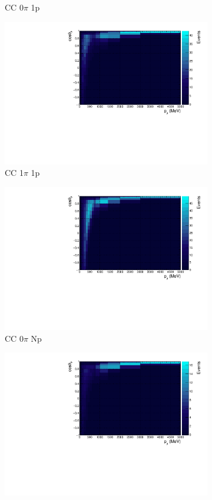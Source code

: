 \begin{figure}
\begin{subfigure}{.49\textwidth}
  \caption{CC 0$\pi$ 1p}
\end{subfigure}
\begin{subfigure}{.49\textwidth}
  \centering
  \includegraphics[width=0.9\linewidth]{figs/hptpc_pmtmuu_cc1pi1p.pdf}
  \caption{CC 1$\pi$ 1p}
\end{subfigure}
\begin{subfigure}{.49\textwidth}
  \centering
  \includegraphics[width=0.9\linewidth]{figs/hptpc_pmtmuu_cc0piNp.pdf}
  \caption{CC 0$\pi$ Np}
\end{subfigure}
\begin{subfigure}{.49\textwidth}
  \centering
  \includegraphics[width=0.9\linewidth]{figs/hptpc_pmtmuu_cc1piNp.pdf}

\end{subfigure}
\end{figure}
